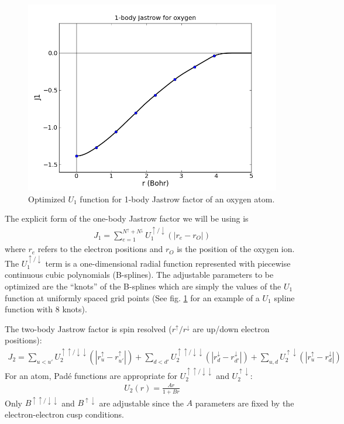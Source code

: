{\begin{figure}
\begin{center}
\includegraphics[trim = 0mm 0mm 0mm 0mm, clip,width=0.75\columnwidth]{./figures/lab_qmc_basics_J1}
\end{center}
\caption{Optimized $U_1$ function for 1-body Jastrow factor of an oxygen atom.
\label{fig:u1_spline}
}
\end{figure}

The explicit form of the one-body Jastrow factor we will be using is
\begin{align}\label{eq:J1}
  J_1 = \sum_{e=1}^{N^\uparrow+N^\downarrow}U_1^{\uparrow/\downarrow}(|r_e-r_O|)
\end{align}
where $r_e$ refers to the electron positions and $r_O$ is 
the position of the oxygen ion.  The $U_1^{\uparrow/\downarrow}$ term is a 
one-dimensional radial function represented with piecewise continuous cubic 
polynomials (B-splines).  The adjustable parameters to be optimized are the 
``knots'' of the B-splines which are simply the values of the $U_1$ function at 
uniformly spaced grid points (See fig. \ref{fig:u1_spline} for an example of a $U_1$ 
spline function with 8 knots).  

The two-body Jastrow factor is spin resolved ($r^\uparrow/r^\downarrow$ are up/down electron positions):
\begin{align}\label{eq:J2}
  J_2 = \sum_{u<u'}U_2^{\uparrow\uparrow/\downarrow\downarrow}(|r_u^\uparrow-r_{u'}^\uparrow|) + \sum_{d<d'}U_2^{\uparrow\uparrow/\downarrow\downarrow}(|r_d^\downarrow-r_{d'}^\downarrow|) + \sum_{u,d} U_2^{\uparrow\downarrow}(|r_u^\uparrow-r_d^\downarrow|)
\end{align}
For an atom, Pad\'{e} functions are appropriate for $U_2^{\uparrow\uparrow/\downarrow\downarrow}$ and $U_2^{\uparrow\downarrow}$:
\begin{align}
  U_2(r) = \frac{Ar}{1+Br}
\end{align}
Only $B^{\uparrow\uparrow/\downarrow\downarrow}$ and $B^{\uparrow\downarrow}$ are adjustable since the $A$ parameters are fixed by the electron-electron cusp conditions.

}
